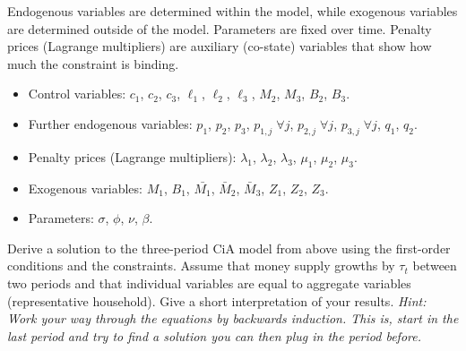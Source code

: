 \documentclass[a4paper, 12pt]{article}
\begin{document}
\begin{Answer}%
	Endogenous variables are determined within the model, while exogenous variables are determined outside of the model. Parameters are fixed over time. Penalty prices (Lagrange multipliers) are auxiliary (co-state) variables that show how much the constraint is binding.%
	\begin{itemize}%
		\item Control variables: $c_1$, $c_2$, $c_3$, $\ell_1$, $\ell_2$, $\ell_3$, $M_2$, $M_3$, $B_2$, $B_3$.%
		\item Further endogenous variables: $p_1$, $p_2$, $p_3$, $p_{1,j} \; \forall j$, $p_{2,j} \; \forall j$, $p_{3,j} \; \forall j$, $q_1$, $q_2$.%
		\item Penalty prices (Lagrange multipliers): $\lambda_1$, $\lambda_2$, $\lambda_3$, $\mu_1$, $\mu_2$, $\mu_3$.%
		\item Exogenous variables: $M_1$, $B_1$, $\bar{M_1}$, $\bar{M}_2$, $\bar{M}_3$, $Z_1$, $Z_2$, $Z_3$.%
		\item Parameters: $\sigma$, $\phi$, $\nu$, $\beta$.%
	\end{itemize}%
\end{Answer}%
\bigskip%
\begin{Exercise}[title={Analytical solution of the model},label=ex_3]%
	Derive a solution to the three-period CiA model from above using the first-order conditions and the constraints. Assume that money supply growths by $\tau_t$ between two periods and that individual variables are equal to aggregate variables (representative household). Give a short interpretation of your results. \textit{Hint: Work your way through the equations by backwards induction. This is, start in the last period and try to find a solution you can then plug in the period before.}%
\end{Exercise}%
\bigskip%
\end{document}
